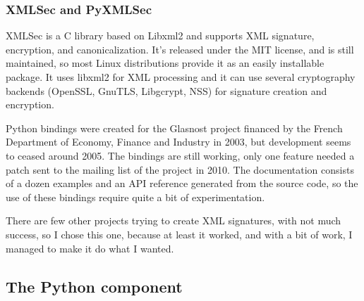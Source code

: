\subsubsection{XMLSec and PyXMLSec}

XMLSec is a C library based on Libxml2 and supports XML signature, encryption, and canonicalization.\cite{xmlsec-homepage} It's released under the MIT license, and is still maintained, so most Linux distributions provide it as an easily installable package. It uses libxml2 for XML processing and it can use several cryptography backends (OpenSSL, GnuTLS, Libgcrypt, NSS) for signature creation and encryption.

Python bindings were created for the Glasnost project financed by the French Department of Economy, Finance and Industry in 2003, but development seems to ceased around 2005. The bindings are still working, only one feature needed a patch sent to the mailing list of the project in 2010. The documentation consists of a dozen examples and an API reference generated from the source code, so the use of these bindings require quite a bit of experimentation.

There are few other projects trying to create XML signatures, with not much success, so I chose this one, because at least it worked, and with a bit of work, I managed to make it do what I wanted.

\subsection{The Python component}

